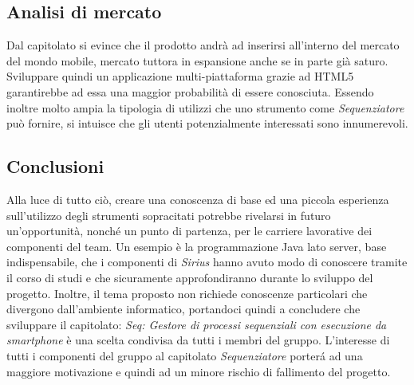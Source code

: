 \subsection{Analisi di mercato}
Dal capitolato si evince che il prodotto andrà ad inserirsi all'interno del mercato del mondo mobile, mercato tuttora in espansione anche se in parte già saturo. Sviluppare quindi un applicazione multi-piattaforma grazie ad HTML5 garantirebbe ad essa una maggior probabilità di essere conosciuta.
Essendo inoltre molto ampia la tipologia di utilizzi che uno strumento come \textit{Sequenziatore} può fornire, si intuisce che gli utenti potenzialmente interessati sono innumerevoli.

\subsection{Conclusioni}
Alla luce di tutto ciò, creare una conoscenza di base ed una piccola esperienza sull'utilizzo degli strumenti sopracitati potrebbe rivelarsi in futuro un'opportunità, nonché un punto di partenza, per le carriere lavorative dei componenti del team. Un esempio è la programmazione Java lato server, base indispensabile, che i componenti di \textit{Sirius} hanno avuto modo di conoscere tramite il corso di studi e che sicuramente approfondiranno durante lo sviluppo del progetto. Inoltre, il tema proposto non richiede conoscenze particolari che divergono dall'ambiente informatico, portandoci quindi a concludere che sviluppare il capitolato: \textit{Seq: Gestore di processi sequenziali con esecuzione da smartphone} è una scelta condivisa da tutti i membri del gruppo. L'interesse di tutti i componenti del gruppo al capitolato \textit{Sequenziatore} porter\'a ad una maggiore motivazione e quindi ad un minore rischio di fallimento del progetto.\\